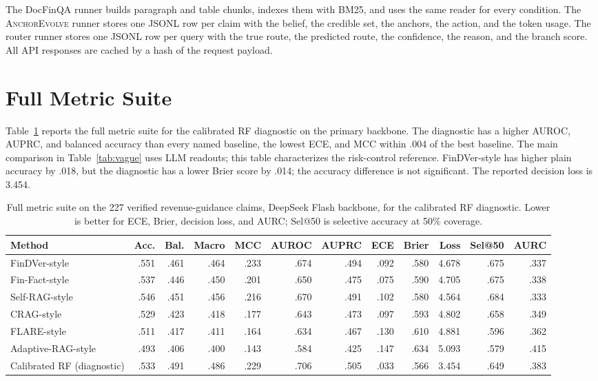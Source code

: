 \documentclass[11pt]{article}
\newcommand{\anchor}{\textsc{AnchorEvolve}}
\begin{document}
The DocFinQA runner builds paragraph and table chunks, indexes them with BM25, and uses the same reader for every condition. The \anchor{} runner stores one JSONL row per claim with the belief, the credible set, the anchors, the action, and the token usage. The router runner stores one JSONL row per query with the true route, the predicted route, the confidence, the reason, and the branch score. All API responses are cached by a hash of the request payload.

\section{Full Metric Suite}
\label{app:fullmetrics}
Table~\ref{tab:fullmetrics} reports the full metric suite for the calibrated RF diagnostic on the primary backbone. The diagnostic has a higher AUROC, AUPRC, and balanced accuracy than every named baseline, the lowest ECE, and MCC within .004 of the best baseline. The main comparison in Table~\ref{tab:vague} uses LLM readouts; this table characterizes the risk-control reference. FinDVer-style has higher plain accuracy by .018, but the diagnostic has a lower Brier score by .014; the accuracy difference is not significant. The reported decision loss is 3.454.

\begin{table}[t]
\centering
\scriptsize
\setlength{\tabcolsep}{4pt}
\caption{Full metric suite on the 227 verified revenue-guidance claims, DeepSeek Flash backbone, for the calibrated RF diagnostic. Lower is better for ECE, Brier, decision loss, and AURC; Sel@50 is selective accuracy at 50\% coverage.}
\label{tab:fullmetrics}
\begin{tabular}{lrrrrrrrrrrr}
\toprule
Method & Acc. & Bal. & Macro & MCC & AUROC & AUPRC & ECE & Brier & Loss & Sel@50 & AURC \\
\midrule
FinDVer-style & .551 & .461 & .464 & .233 & .674 & .494 & .092 & .580 & 4.678 & .675 & .337 \\
Fin-Fact-style & .537 & .446 & .450 & .201 & .650 & .475 & .075 & .590 & 4.705 & .675 & .338 \\
Self-RAG-style & .546 & .451 & .456 & .216 & .670 & .491 & .102 & .580 & 4.564 & .684 & .333 \\
CRAG-style & .529 & .423 & .418 & .177 & .643 & .473 & .097 & .593 & 4.802 & .658 & .349 \\
FLARE-style & .511 & .417 & .411 & .164 & .634 & .467 & .130 & .610 & 4.881 & .596 & .362 \\
Adaptive-RAG-style & .493 & .406 & .400 & .143 & .584 & .425 & .147 & .634 & 5.093 & .579 & .415 \\
Calibrated RF (diagnostic) & .533 & .491 & .486 & .229 & .706 & .505 & .033 & .566 & 3.454 & .649 & .383 \\
\bottomrule
\end{tabular}
\end{table}
\end{document}
